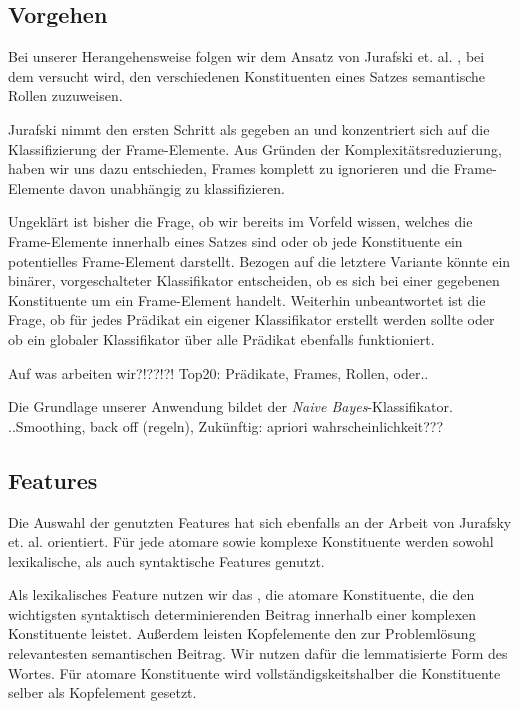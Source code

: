 \documentclass[12pt]{article}
\begin{document}
\subsection{Vorgehen}

Bei unserer Herangehensweise folgen wir dem Ansatz von Jurafski et. al. \cite{},
bei dem versucht wird, den verschiedenen Konstituenten eines Satzes
semantische Rollen zuzuweisen. 


Jurafski nimmt den ersten Schritt als gegeben an und konzentriert sich auf die
Klassifizierung der Frame-Elemente. Aus Gründen der
Komplexitätsreduzierung, haben wir uns dazu entschieden, Frames komplett zu
ignorieren und die Frame-Elemente davon unabhängig zu klassifizieren.

Ungeklärt ist bisher die Frage, ob wir bereits im Vorfeld wissen, welches die
Frame-Elemente innerhalb eines Satzes sind oder ob jede Konstituente ein
potentielles Frame-Element darstellt. Bezogen auf die letztere Variante könnte
ein binärer, vorgeschalteter Klassifikator entscheiden, ob es sich bei einer
gegebenen Konstituente um ein Frame-Element handelt. Weiterhin unbeantwortet ist
die Frage, ob für jedes Prädikat ein eigener Klassifikator erstellt werden
sollte oder ob ein globaler Klassifikator über alle Prädikat ebenfalls funktioniert.


Auf was arbeiten wir?!??!?! Top20: Prädikate, Frames, Rollen, oder..


Die Grundlage unserer Anwendung bildet der \textit{Naive Bayes}-Klassifikator. 
..Smoothing, back off (regeln), Zukünftig: apriori wahrscheinlichkeit???
 
\subsection{Features}

Die Auswahl der genutzten Features hat sich ebenfalls an der Arbeit von Jurafsky
et. al. orientiert. Für jede atomare sowie komplexe Konstituente werden sowohl
lexikalische, als auch syntaktische Features genutzt.

Als lexikalisches Feature nutzen wir das , die atomare
Konstituente, die den wichtigsten syntaktisch determinierenden Beitrag innerhalb einer
komplexen Konstituente leistet. Außerdem leisten Kopfelemente den zur
Problemlösung relevantesten semantischen Beitrag. Wir nutzen dafür die
lemmatisierte Form des Wortes. Für atomare Konstituente wird
vollständigskeitshalber die Konstituente selber als Kopfelement gesetzt.
\end{document}
